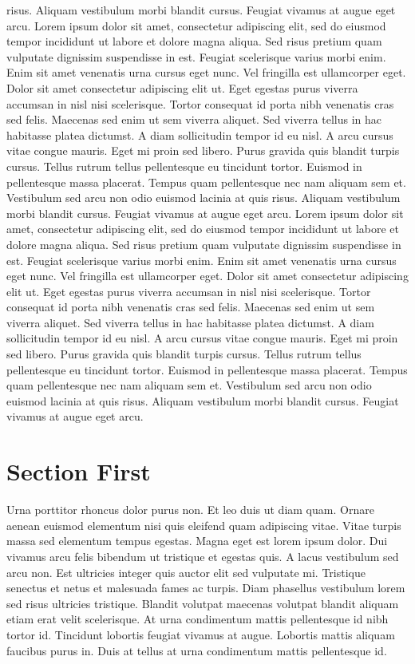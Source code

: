 risus. Aliquam vestibulum morbi blandit cursus. Feugiat vivamus at augue
 eget arcu.
Lorem
 ipsum dolor sit amet, consectetur adipiscing elit, sed do eiusmod
tempor incididunt ut labore et dolore magna aliqua. Sed risus pretium
quam vulputate dignissim suspendisse in est. Feugiat scelerisque varius
morbi enim. Enim sit amet venenatis urna cursus eget nunc. Vel fringilla
 est ullamcorper eget. Dolor sit amet consectetur adipiscing elit ut.
Eget egestas purus viverra accumsan in nisl nisi scelerisque. Tortor
consequat id porta nibh venenatis cras sed felis. Maecenas sed enim ut
sem viverra aliquet. Sed viverra tellus in hac habitasse platea
dictumst. A diam sollicitudin tempor id eu nisl. A arcu cursus vitae
congue mauris. Eget mi proin sed libero. Purus gravida quis blandit
turpis cursus. Tellus rutrum tellus pellentesque eu tincidunt tortor.
Euismod in pellentesque massa placerat. Tempus quam pellentesque nec nam
 aliquam sem et. Vestibulum sed arcu non odio euismod lacinia at quis
risus. Aliquam vestibulum morbi blandit cursus. Feugiat vivamus at augue
 eget arcu.
Lorem
 ipsum dolor sit amet, consectetur adipiscing elit, sed do eiusmod
tempor incididunt ut labore et dolore magna aliqua. Sed risus pretium
quam vulputate dignissim suspendisse in est. Feugiat scelerisque varius
morbi enim. Enim sit amet venenatis urna cursus eget nunc. Vel fringilla
 est ullamcorper eget. Dolor sit amet consectetur adipiscing elit ut.
Eget egestas purus viverra accumsan in nisl nisi scelerisque. Tortor
consequat id porta nibh venenatis cras sed felis. Maecenas sed enim ut
sem viverra aliquet. Sed viverra tellus in hac habitasse platea
dictumst. A diam sollicitudin tempor id eu nisl. A arcu cursus vitae
congue mauris. Eget mi proin sed libero. Purus gravida quis blandit
turpis cursus. Tellus rutrum tellus pellentesque eu tincidunt tortor.
Euismod in pellentesque massa placerat. Tempus quam pellentesque nec nam
 aliquam sem et. Vestibulum sed arcu non odio euismod lacinia at quis
risus. Aliquam vestibulum morbi blandit cursus. Feugiat vivamus at augue
 eget arcu.

\section{Section First}
Urna porttitor rhoncus dolor purus non. Et leo duis ut diam quam. 
Ornare aenean euismod elementum nisi quis eleifend quam adipiscing 
vitae. Vitae turpis massa sed elementum tempus egestas. Magna eget est 
lorem ipsum dolor. Dui vivamus arcu felis bibendum ut tristique et 
egestas quis. A lacus vestibulum sed arcu non. Est ultricies integer 
quis auctor elit sed vulputate mi. Tristique senectus et netus et 
malesuada fames ac turpis. Diam phasellus vestibulum lorem sed risus 
ultricies tristique. Blandit volutpat maecenas volutpat blandit aliquam 
etiam erat velit scelerisque. At urna condimentum mattis pellentesque id
 nibh tortor id. Tincidunt lobortis feugiat vivamus at augue. Lobortis 
mattis aliquam faucibus purus in. Duis at tellus at urna condimentum 
mattis pellentesque id.


